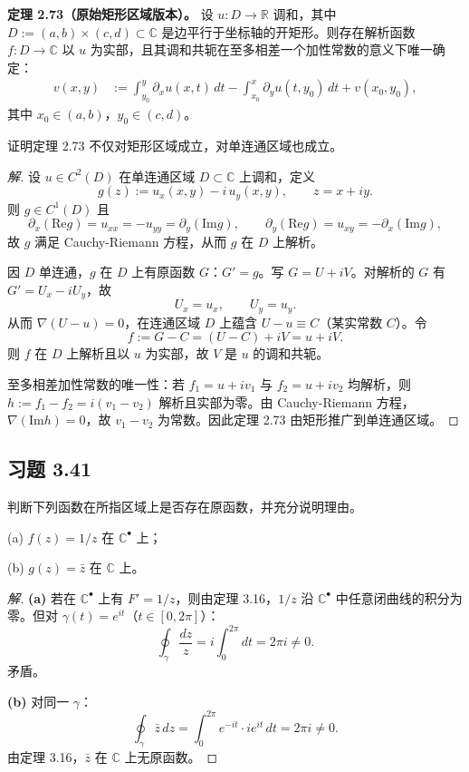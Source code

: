 \documentclass[11pt,a4paper]{article}
\newcommand{\R}{\mathbb{R}}
\newcommand{\C}{\mathbb{C}}
\renewcommand{\Re}{\mathrm{Re}}
\renewcommand{\Im}{\mathrm{Im}}
\theoremstyle{definition}
\newenvironment{solution}{\begin{proof}[解]}{\end{proof}}
\begin{document}
\textbf{定理 2.73（原始矩形区域版本）。}
设 $u:D\to\R$ 调和，其中 $D:=(a,b)\times(c,d)\subset\C$ 是边平行于坐标轴的开矩形。则存在解析函数 $f:D\to\C$ 以 $u$ 为实部，且其调和共轭在至多相差一个加性常数的意义下唯一确定：
\[
\begin{aligned}
v(x,y)
&:=\int_{y_0}^{y}\partial_xu(x,t)\,dt
-\int_{x_0}^{x}\partial_yu(t,y_0)\,dt
+v(x_0,y_0),
\end{aligned}
\]
其中 $x_0\in(a,b)$，$y_0\in(c,d)$。

证明定理 2.73 不仅对矩形区域成立，对单连通区域也成立。

\begin{solution}
	设 $u\in C^2(D)$ 在单连通区域 $D\subset\C$ 上调和，定义
	\[
		g(z):=u_x(x,y)-i\,u_y(x,y),\qquad z=x+iy.
	\]
	则 $g\in C^1(D)$ 且
	\[
		\partial_x(\Re g)=u_{xx}=-u_{yy}=\partial_y(\Im g),
		\qquad
		\partial_y(\Re g)=u_{xy}=-\partial_x(\Im g),
	\]
	故 $g$ 满足 Cauchy-Riemann 方程，从而 $g$ 在 $D$ 上解析。

	因 $D$ 单连通，$g$ 在 $D$ 上有原函数 $G$：$G'=g$。写 $G=U+iV$。对解析的 $G$ 有 $G'=U_x-iU_y$，故
	\[
		U_x=u_x,\qquad U_y=u_y.
	\]
	从而 $\nabla(U-u)=0$，在连通区域 $D$ 上蕴含 $U-u\equiv C$（某实常数 $C$）。令
	\[
		f:=G-C=(U-C)+iV=u+iV.
	\]
	则 $f$ 在 $D$ 上解析且以 $u$ 为实部，故 $V$ 是 $u$ 的调和共轭。

	至多相差加性常数的唯一性：若 $f_1=u+iv_1$ 与 $f_2=u+iv_2$ 均解析，则 $h:=f_1-f_2=i(v_1-v_2)$ 解析且实部为零。由 Cauchy-Riemann 方程，$\nabla(\Im h)=0$，故 $v_1-v_2$ 为常数。因此定理 2.73 由矩形推广到单连通区域。\qedhere
\end{solution}

\subsection{习题 3.41}

判断下列函数在所指区域上是否存在原函数，并充分说明理由。

(a) $f(z)=1/z$ 在 $\C^\bullet$ 上；

(b) $g(z)=\bar{z}$ 在 $\C$ 上。

\begin{solution}
	\textbf{(a)}\;
	若在 $\C^\bullet$ 上有 $F'=1/z$，则由定理 3.16，$1/z$ 沿 $\C^\bullet$ 中任意闭曲线的积分为零。但对 $\gamma(t)=e^{it}$（$t\in[0,2\pi]$）：
	\[
		\oint_\gamma\frac{dz}{z}
		=i\int_0^{2\pi}dt=2\pi i\neq0.
	\]
	矛盾。

	\medskip

	\textbf{(b)}\;
	对同一 $\gamma$：
	\[
		\oint_\gamma\bar z\,dz
		=\int_0^{2\pi}e^{-it}\cdot ie^{it}\,dt=2\pi i\neq0.
	\]
	由定理 3.16，$\bar z$ 在 $\C$ 上无原函数。\qedhere
\end{solution}
\end{document}
